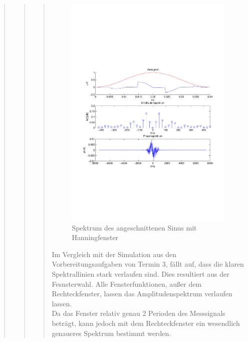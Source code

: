 \begin{quote}
\begin{quote}
\begin{quote}
            \begin{figure}[H]
                \centering
                
                \includegraphics[scale=0.7, trim = 1.5cm 7cm 1.5cm 8.5cm,
                clip]{./Bilder/Phasenanschnittsmessungmithanningfenster.pdf}
                    \caption{Spektrum des angeschnittenen Sinus mit Hanningfenster}
            \end{figure}
    
            Im Vergleich mit der Simulation aus den Vorbereitungsaufgaben von Termin 3, fällt auf, dass die klaren
            Spektrallinien stark verlaufen sind. Dies resultiert aus der Fesnsterwahl. Alle Fensterfunktionen, außer dem
            Rechteckfenster, lassen das Amplitudenspektrum verlaufen lassen.\\
            Da das Fenster relativ genau 2 Perioden des Messsignals beträgt, kann jedoch mit dem Rechteckfenster ein
            wesendlich genaueres Spektrum bestimmt werden.\\
            

\end{quote}
\end{quote}
\end{quote}
